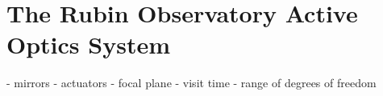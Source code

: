 \chapter{The Rubin Observatory Active Optics System}
\label{chap:aos}

- mirrors
- actuators
- focal plane
- visit time
- range of degrees of freedom